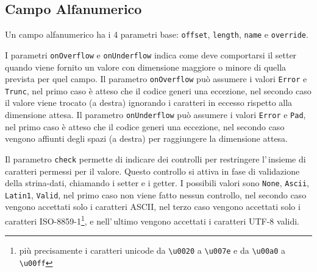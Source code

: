 \documentclass[a4paper,10pt]{report}
\begin{document}
\subsection{Campo Alfanumerico}
Un campo alfanumerico ha i 4 parametri base: \verb!offset!, \verb!length!,
\verb!name! e \verb!override!.

I parametri \verb!onOverflow! e \verb!onUnderflow! indica come deve comportarsi
il setter quando viene fornito un valore con dimensione maggiore o minore di
quella prevista per quel campo.
Il parametro \hypertarget{abc:ovf}{\texttt{onOverflow}} può assumere i valori 
\verb!Error! e \verb!Trunc!, nel primo caso è atteso che il codice generi una 
eccezione, nel secondo caso il valore viene trocato (a destra) ignorando i 
caratteri in eccesso rispetto alla dimensione attesa.
Il parametro \hypertarget{abc:unf}{\texttt{onUnderflow}} può assumere i valori 
\verb!Error! e \verb!Pad!, nel primo caso è atteso che il codice generi una 
eccezione, nel secondo caso vengono affiunti degli spazi (a destra) per 
raggiungere la dimensione attesa.

Il parametro \hypertarget{abc:chk}{\texttt{check}} permette di indicare dei 
controlli per restringere l'\,insieme di caratteri permessi per il valore. 
Questo controllo si attiva in fase di validazione della strina-dati, chiamando 
i setter e i getter.
I possibili valori sono \verb!None!, \verb!Ascii!, \verb!Latin1!, \verb!Valid!,
nel primo caso non viene fatto nessun controllo, nel secondo caso vengono 
accettati solo i caratteri ASCII, nel terzo caso vengono accettati solo i 
caratteri ISO-8859-1\footnote{più precisamente i caratteri unicode da 
\texttt{\textbackslash u0020} a \texttt{\textbackslash u007e} e 
da \texttt{\textbackslash u00a0} a \texttt{\textbackslash u00ff}}, e 
nell'\,ultimo vengono accettati i caratteri UTF-8 validi.
\end{document}
